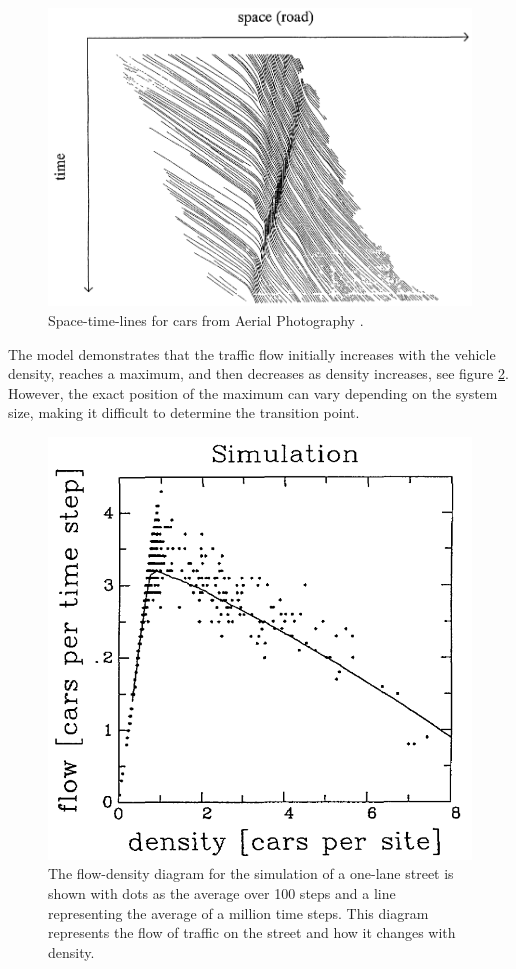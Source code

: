 \begin{figure}
	\centering
    \includegraphics[width=0.8\linewidth]{images/nasch_space_time_diagram.png}
    \caption{Space-time-lines for cars from Aerial Photography \cite{NASCH1992}.}
    \label{fig:nasch_space_time_diagram}
\end{figure}

The model demonstrates that the traffic flow initially increases with the vehicle density, reaches a maximum, and then decreases as density increases, see figure \ref{fig:nasch_flow_density_diagram}. However, the exact position of the maximum can vary depending on the system size, making it difficult to determine the transition point\cite{NASCH1992}.

\begin{figure}
	\centering
    \includegraphics[width=0.8\linewidth]{images/nasch_flow_density_diagram.png}
    \caption{The flow-density diagram for the simulation of a one-lane street is shown with dots as the average over 100 steps and a line representing the average of a million time steps. This diagram represents the flow of traffic on the street and how it changes with density\cite{NASCH1992}.}
    \label{fig:nasch_flow_density_diagram}
\end{figure}

